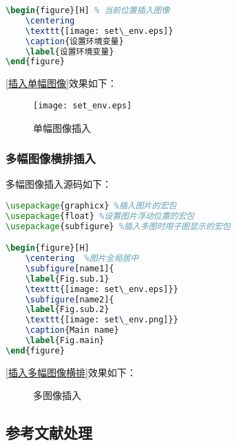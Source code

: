 \documentclass[../main.tex]{subfiles}
\begin{document}
\begin{lstlisting}[caption={插入单幅图像},label={插入单幅图像},language=TeX]
\begin{figure}[H] % 当前位置插入图像
    \centering
    \texttt{[image: set\_env.eps]}
    \caption{设置环境变量}
    \label{设置环境变量}
\end{figure}
\end{lstlisting}

\ref{插入单幅图像}效果如下：
\begin{figure}[H] %
    \centering
    \texttt{[image: set\_env.eps]}
    \caption{单幅图像插入}
    \label{单幅图像插入}
\end{figure}

\subsubsection{多幅图像横排插入}
多幅图像插入源码如下：
\begin{lstlisting}[caption={插入多幅图像横排},label={插入多幅图像横排},language=TeX]
%导言区插入下面三行
\usepackage{graphicx} %插入图片的宏包
\usepackage{float} %设置图片浮动位置的宏包
\usepackage{subfigure} %插入多图时用子图显示的宏包

\begin{figure}[H]
    \centering  %图片全局居中
    \subfigure[name1]{
    \label{Fig.sub.1}
    \texttt{[image: set\_env.eps]}}
    \subfigure[name2]{
    \label{Fig.sub.2}
    \texttt{[image: set\_env.png]}}
    \caption{Main name}
    \label{Fig.main}
\end{figure}
\end{lstlisting}

\ref{插入多幅图像横排}效果如下：
\begin{figure}[H]
    \centering  %
    \caption{多图像插入}
    \label{多图像插入}
\end{figure}

\subsection{参考文献处理}
\end{document}
